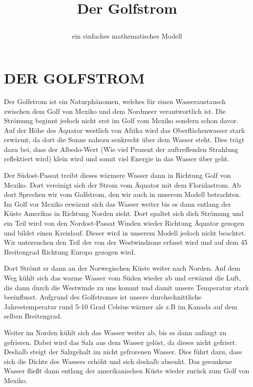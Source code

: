 \documentclass[a4paper,twoside]{article}
\begin{document}
	\title{Der Golfstrom\subtitle{ein einfaches mathematisches Modell} }
	
	\author{}
	

	
	\onecolumn \maketitle \normalsize \vfill

	\section{\uppercase{Der Golfstrom}}\label{sec:Golfstrom}

	\noindent Der Golfstrom ist ein Naturphänomen, welches für einen Wasseraustausch zwischen dem Golf von Mexiko und dem Nordmeer verantwortlich ist. Die Strömung beginnt jedoch nicht erst im Golf vom Mexiko sondern schon davor. Auf der Höhe des Äquator westlich von Afrika wird das Oberflächenwasser stark erwärmt, da dort die Sonne nahezu senkrecht über dem Wasser steht. Dies trägt dazu bei, dass der Albedo-Wert (Wie viel Prozent der auftreffenden Strahlung reflektiert wird) klein wird und somit viel Energie in das Wasser über geht.

	Der Südost-Passat treibt dieses wärmere Wasser dann in Richtung Golf von Mexiko. Dort vereinigt sich der Strom vom Äquator mit dem Floridastrom. Ab dort Sprechen wir vom Golfstrom, den wir auch in unserem Modell betrachten. Im Golf vor Mexiko erwärmt sich das Wasser weiter bis es dann entlang der Küste Amerikas in Richtung Norden zieht. Dort spaltet sich dich Strömung und ein Teil wird von den Nordost-Passat Winden wieder Richtung Äquator gezogen und bildet einen Kreislauf. Dieser wird in unserem Modell jedoch nicht beachtet. Wir untersuchen den Teil der von der Westwindzone erfasst wird und auf dem 45 Breitengrad Richtung Europa gezogen wird.

	Dort Strömt er dann an der Norwegischen Küste weiter nach Norden. Auf dem Weg kühlt sich das warme Wasser vom Süden wieder ab und erwärmt die Luft, die dann durch die Westwinde zu uns kommt und damit unsere Temperatur stark beeinflusst. Aufgrund des Golfstromes ist unsere durchschnittliche Jahrestemperatur rund 5-10 Grad Celsius wärmer als z.B im Kanada auf dem selben Breitengrad. 

	Weiter im Norden kühlt sich das Wasser weiter ab, bis es dann anfängt zu gefrieren. Dabei wird das Salz aus dem Wasser gelöst, da dieses nicht gefriert. Deshalb steigt der Salzgehalt im nicht gefrorenen Wasser. Dies führt dazu, dass sich die Dichte des Wassers erhöht und sich deshalb absenkt. Das gesunkene Wasser fließt dann entlang der amerikanischen Küste wieder zurück zum Golf von Mexiko.
\end{document}

